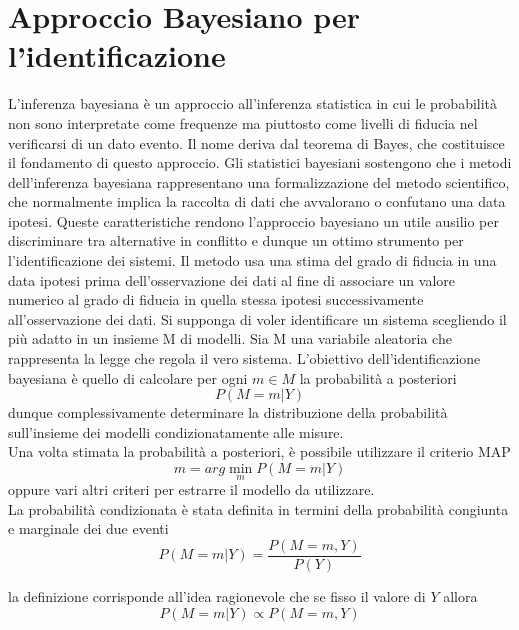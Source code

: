 \documentclass[10pt,a4paper,oneside,openany,noindent]{book}
\begin{document}
\section{Approccio Bayesiano per l’identificazione}
L’inferenza bayesiana è un approccio all’inferenza statistica in cui le probabilità
non sono interpretate come frequenze ma piuttosto come livelli di fiducia nel verificarsi di un dato evento. Il nome deriva dal teorema di Bayes, che costituisce il
fondamento di questo approccio. Gli statistici bayesiani sostengono che i metodi
dell’inferenza bayesiana rappresentano una formalizzazione del metodo scientifico,
che normalmente implica la raccolta di dati che avvalorano o confutano una data
ipotesi.
Queste caratteristiche rendono l’approccio bayesiano un utile ausilio per discriminare tra alternative in conflitto e dunque un ottimo strumento per l’identificazione
dei sistemi.
Il metodo usa una stima del grado di fiducia in una data ipotesi prima dell’osservazione
dei dati al fine di associare un valore numerico al grado di fiducia in quella stessa
ipotesi successivamente all’osservazione dei dati. Si supponga di voler identificare
un sistema scegliendo il più adatto in un insieme M di modelli.
Sia M una variabile aleatoria che rappresenta la legge che regola il vero sistema.
L’obiettivo dell’identificazione bayesiana è quello di calcolare per ogni $m\in M$ la
probabilità a posteriori
\begin{equation} P (M = m|Y )
\end{equation}
dunque complessivamente determinare la distribuzione della probabilità sull’insieme
dei modelli condizionatamente alle misure.\\
Una volta stimata la probabilità a posteriori, è possibile utilizzare il criterio MAP
\begin{equation}
m=arg \min_m P(M = m|Y )
\end{equation} oppure vari altri criteri per estrarre il modello da utilizzare.\\
La probabilità condizionata è stata definita in termini della probabilità congiunta e
marginale dei due eventi
\begin{equation}
P (M = m|Y ) =\frac{
P (M = m, Y )}{
P (Y )}
\end{equation}

la definizione corrisponde all’idea ragionevole che se fisso il valore di $Y$ allora
\begin{equation}
P (M = m|Y ) \propto P (M = m, Y )
\end{equation}
\end{document}
